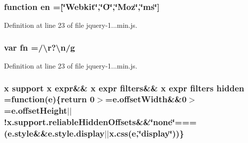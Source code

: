 \subsubsection[{en}]{\setlength{\rightskip}{0pt plus 5cm}function en =\mbox{[}\char`\"{}Webkit\char`\"{},\char`\"{}O\char`\"{},\char`\"{}Moz\char`\"{},\char`\"{}ms\char`\"{}\mbox{]}}\label{obj_2_release_2_package_2_package_tmp_2_scripts_2jquery-1_810_82_8min_8js_a5d7a777130eac935addcf4926a74b23c}


Definition at line 23 of file jquery-\/1...\+min.\+js.

\hypertarget{obj_2_release_2_package_2_package_tmp_2_scripts_2jquery-1_810_82_8min_8js_a37b9e1ceee4c6d2616fa6081784b5468}{}
\subsubsection[{fn}]{\setlength{\rightskip}{0pt plus 5cm}var fn =/\textbackslash{}r?\textbackslash{}n/{\bf g}}\label{obj_2_release_2_package_2_package_tmp_2_scripts_2jquery-1_810_82_8min_8js_a37b9e1ceee4c6d2616fa6081784b5468}


Definition at line 23 of file jquery-\/1...\+min.\+js.

\hypertarget{obj_2_release_2_package_2_package_tmp_2_scripts_2jquery-1_810_82_8min_8js_a086b6295ec8d15f090cd7239137a4979}{}
\subsubsection[{hidden}]{ {\bf x} support {\bf x} expr\&\& {\bf x} expr filters\&\& {\bf x} expr filters hidden =function({\bf e})\{return 0$>$=e.\+offset\+Width\&\&0$>$=e.\+offset\+Height$\vert$$\vert$!x.\+support.\+reliable\+Hidden\+Offsets\&\&\char`\"{}none\char`\"{}===(e.\+style\&\&e.\+style.\+display$\vert$$\vert$x.\+css({\bf e},\char`\"{}display\char`\"{}))\}}\label{obj_2_release_2_package_2_package_tmp_2_scripts_2jquery-1_810_82_8min_8js_a086b6295ec8d15f090cd7239137a4979}


